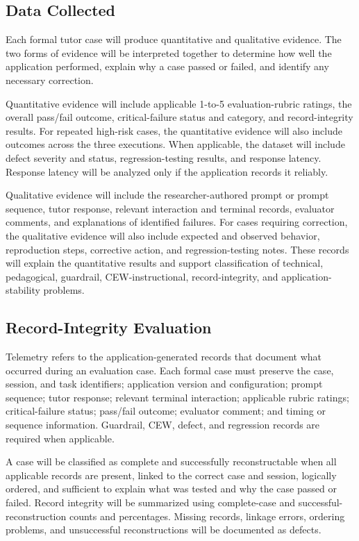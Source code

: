 \documentclass[conference]{IEEEtran}
\begin{document}
\subsection{Data Collected}

Each formal tutor case will produce quantitative and qualitative
evidence. The two forms of evidence will be interpreted together to
determine how well the application performed, explain why a case passed
or failed, and identify any necessary correction.

Quantitative evidence will include applicable 1-to-5 evaluation-rubric
ratings, the overall pass/fail outcome, critical-failure status and
category, and record-integrity results. For repeated high-risk cases,
the quantitative evidence will also include outcomes across the three
executions. When applicable, the dataset will include defect severity
and status, regression-testing results, and response latency. Response
latency will be analyzed only if the application records it reliably.

Qualitative evidence will include the researcher-authored prompt or
prompt sequence, tutor response, relevant interaction and terminal
records, evaluator comments, and explanations of identified failures.
For cases requiring correction, the qualitative evidence will also
include expected and observed behavior, reproduction steps, corrective
action, and regression-testing notes. These records will explain the
quantitative results and support classification of technical,
pedagogical, guardrail, CEW-instructional, record-integrity, and
application-stability problems.

\subsection{Record-Integrity Evaluation}

Telemetry refers to the application-generated records that document what occurred during an evaluation case. Each formal case must preserve the case, session, and task identifiers; application version and configuration; prompt sequence; tutor response; relevant terminal interaction; applicable rubric ratings; critical-failure status; pass/fail outcome; evaluator comment; and timing or sequence information. Guardrail, CEW, defect, and regression records are required when applicable.

A case will be classified as complete and successfully reconstructable when all applicable records are present, linked to the correct case and session, logically ordered, and sufficient to explain what was tested and why the case passed or failed. Record integrity will be summarized using complete-case and successful-reconstruction counts and percentages. Missing records, linkage errors, ordering problems, and unsuccessful reconstructions will be documented as defects.
\end{document}
